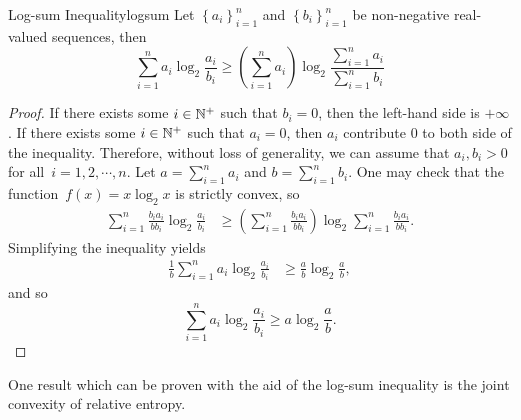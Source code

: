 \documentclass[math]{amznotes}
\theoremstyle{remark}
\begin{document}
\begin{thmbox}{Log-sum Inequality}{logsum}
    Let $\left\{a_i\right\}_{i = 1}^n$ and $\left\{b_i\right\}_{i = 1}^n$ be non-negative real-valued sequences, then 
    \begin{equation*}
        \sum_{i = 1}^{n}a_i\log_2\frac{a_i}{b_i} \geq \left(\sum_{i = 1}^{n}a_i\right)\log_2\frac{\sum_{i = 1}^{n}a_i}{\sum_{i = 1}^{n}b_i}
    \end{equation*}
    \tcblower
    \begin{proof}
        If there exists some $i \in \mathbb{N}^+$ such that $b_i = 0$, then the left-hand side is $+\infty$. If there exists some $i \in \mathbb{N}^+$ such that $a_i = 0$, then $a_i$ contribute $0$ to both side of the inequality. Therefore, without loss of generality, we can assume that $a_i, b_i > 0$ for all~$i = 1, 2, \cdots, n$. Let $a = \sum_{i = 1}^{n}a_i$ and $b = \sum_{i = 1}^nb_i$. One may check that the function~$f\left(x\right) = x\log_2x$ is strictly convex, so
        \begin{align*}
            \sum_{i = 1}^{n}\frac{b_ia_i}{bb_i}\log_2\frac{a_i}{b_i} & \geq \left(\sum_{i = 1}^{n}\frac{b_ia_i}{bb_i}\right)\log_2\sum_{i = 1}^{n}\frac{b_ia_i}{bb_i}.
        \end{align*}
        Simplifying the inequality yields 
        \begin{align*}
            \frac{1}{b}\sum_{i = 1}^{n}a_i\log_2\frac{a_i}{b_i} & \geq \frac{a}{b}\log_2\frac{a}{b},
        \end{align*}
        and so 
        \begin{equation*}
            \sum_{i = 1}^{n}a_i\log_2\frac{a_i}{b_i} \geq a\log_2\frac{a}{b}.
        \end{equation*}
    \end{proof}
\end{thmbox}
One result which can be proven with the aid of the log-sum inequality is the joint convexity of relative entropy.
\end{document}
